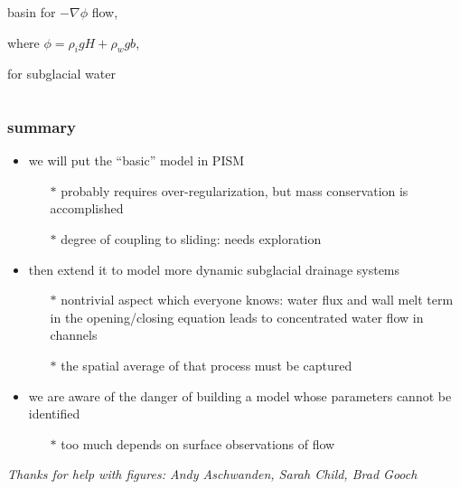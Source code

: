 \documentclass[hide notes,intlimits]{beamer}
\begin{document}
\begin{frame}
\begin{columns}
\begin{column}{0.5\textwidth}
\begin{center}
basin for $-\nabla \phi$ flow,

where $\phi = \rho_i g H + \rho_w g b$,

for subglacial water
\end{center}
\end{column}
\end{columns}

\end{frame}


{
} 


\begin{frame}
  \frametitle{summary}

  \begin{itemize}
  \item we will put the ``basic'' model in PISM
    \begin{itemize}
    \small
    \item[$\ast$] probably requires over-regularization, but mass conservation is accomplished
    \item[$\ast$] degree of coupling to sliding: needs exploration
    \end{itemize}
    \normalsize
  \item then extend it to model more dynamic subglacial drainage systems
    \begin{itemize}
    \small
    \item[$\ast$] nontrivial aspect which everyone knows: water flux and wall melt term in the opening/closing equation  leads to concentrated water flow in channels
    \item[$\ast$] the spatial average of that process must be captured
    \end{itemize}
    \normalsize
  \item we are aware of the danger of building a model whose parameters cannot be identified
    \begin{itemize}
    \small
    \item[$\ast$] too much depends on surface observations of flow
    \end{itemize}
    \normalsize
  \end{itemize}

\vspace{17mm}
  \begin{center}
  \tiny \emph{Thanks for help with figures: Andy Aschwanden, Sarah Child, Brad Gooch}
  \end{center}
\end{frame}
\end{document}
